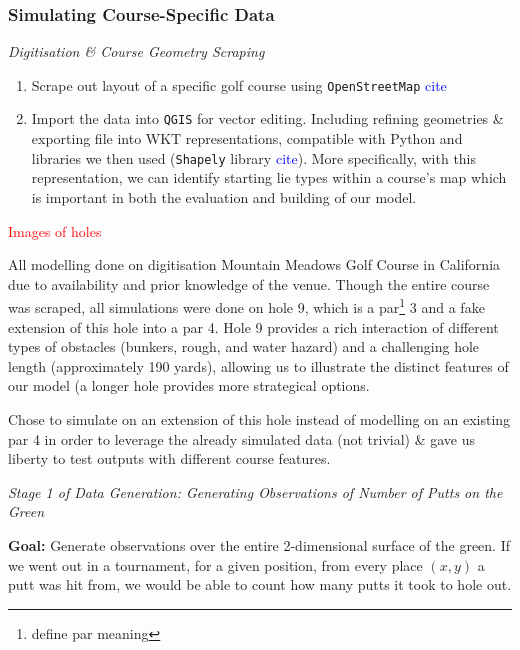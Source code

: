 \documentclass[11pt, letterpaper]{article}
\begin{document}
\subsubsection{Simulating Course-Specific Data}
\emph{Digitisation \& Course Geometry Scraping}
\begin{enumerate}
    \item Scrape out layout of a specific golf course using \texttt{OpenStreetMap} \textcolor{blue}{cite}
    \item Import the data into \texttt{QGIS} for vector editing. Including refining geometries \& exporting file into WKT representations, compatible with Python and libraries we then used (\texttt{Shapely} library \textcolor{blue}{cite}). More specifically, with this representation, we can identify starting lie types within a course's map which is important in both the evaluation and building of our model.
\end{enumerate}

\textcolor{red}{Images of holes}

    All modelling done on digitisation Mountain Meadows Golf Course in California due to availability and prior knowledge of the venue. Though the entire course was scraped, all simulations were done on hole 9, which is a par\footnote{define par meaning} 3 and a fake extension of this hole into a par 4. Hole 9 provides a rich interaction of different types of obstacles (bunkers, rough, and water hazard) and a challenging hole length (approximately 190 yards), allowing us to illustrate the distinct features of our model (a longer hole provides more strategical options. 

    Chose to simulate on an extension of this hole instead of modelling on an existing par 4 in order to leverage the already simulated data (not trivial) \& gave us liberty to test outputs with different course features.
    
\medskip
\emph{Stage 1 of Data Generation: Generating Observations of Number of Putts on the Green}
\medskip

\textbf{Goal:} Generate observations over the entire 2-dimensional surface of the green. If we went out in a tournament, for a given position, from every place $(x,y)$ a putt was hit from, we would be able to count how many putts it took to hole out.
\end{document}
